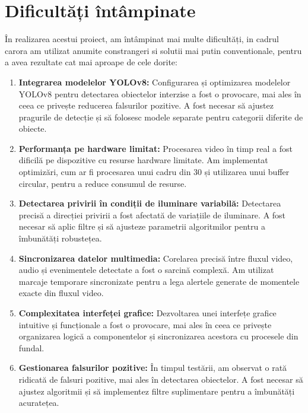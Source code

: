 \documentclass[12pt,a4paper]{article}
\begin{document}
\section{Dificultăți întâmpinate}

În realizarea acestui proiect, am întâmpinat mai multe dificultăți, in cadrul carora am utilizat anumite constrangeri si solutii mai putin conventionale, pentru a avea rezultate cat mai aproape de cele dorite:

\begin{enumerate}
    \item \textbf{Integrarea modelelor YOLOv8:} Configurarea și optimizarea modelelor YOLOv8 pentru detectarea obiectelor interzise a fost o provocare, mai ales în ceea ce privește reducerea falsurilor pozitive. A fost necesar să ajustez pragurile de detecție și să folosesc modele separate pentru categorii diferite de obiecte.

    \item \textbf{Performanța pe hardware limitat:} Procesarea video în timp real a fost dificilă pe dispozitive cu resurse hardware limitate. Am implementat optimizări, cum ar fi procesarea unui cadru din 30 și utilizarea unui buffer circular, pentru a reduce consumul de resurse.

    \item \textbf{Detectarea privirii în condiții de iluminare variabilă:} Detectarea precisă a direcției privirii a fost afectată de variațiile de iluminare. A fost necesar să aplic filtre și să ajusteze parametrii algoritmilor pentru a îmbunătăți robustețea.

    \item \textbf{Sincronizarea datelor multimedia:} Corelarea precisă între fluxul video, audio și evenimentele detectate a fost o sarcină complexă. Am utilizat marcaje temporare sincronizate pentru a lega alertele generate de momentele exacte din fluxul video.

    \item \textbf{Complexitatea interfeței grafice:} Dezvoltarea unei interfețe grafice intuitive și funcționale a fost o provocare, mai ales în ceea ce privește organizarea logică a componentelor și sincronizarea acestora cu procesele din fundal.

    \item \textbf{Gestionarea falsurilor pozitive:} În timpul testării, am observat o rată ridicată de falsuri pozitive, mai ales în detectarea obiectelor. A fost necesar să ajustez algoritmii și să implementez filtre suplimentare pentru a îmbunătăți acuratețea.


\end{enumerate}
\end{document}
